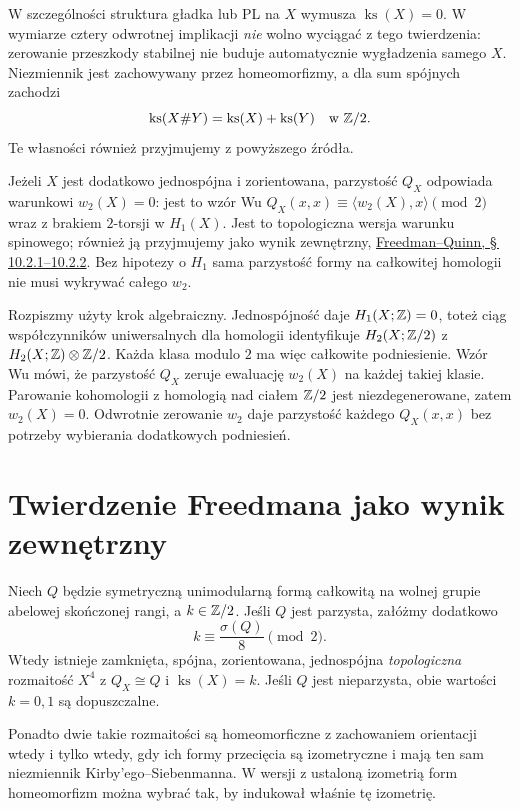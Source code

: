 W szczególności struktura gładka lub PL na $X$
wymusza $\operatorname{ks}(X)=0$. W wymiarze cztery
odwrotnej implikacji \emph{nie} wolno wyciągać z
tego twierdzenia: zerowanie przeszkody stabilnej
nie buduje automatycznie wygładzenia samego $X$.
Niezmiennik jest zachowywany przez homeomorfizmy,
a dla sum spójnych zachodzi
\[
 \operatorname{ks}(X\#Y)
   =\operatorname{ks}(X)+\operatorname{ks}(Y)
       \quad\text{w }\mathbb{Z}/2.
\]
Te własności również przyjmujemy z powyższego źródła.

Jeżeli $X$ jest dodatkowo jednospójna i zorientowana,
parzystość $Q_X$ odpowiada warunkowi
$w_2(X)=0$: jest to wzór Wu
$Q_X(x,x)\equiv\langle w_2(X),x\rangle\pmod2$
wraz z brakiem $2$-torsji w $H_1(X)$.
Jest to topologiczna wersja warunku spinowego;
również ją przyjmujemy jako wynik zewnętrzny,
\href{https://archive.mpim-bonn.mpg.de/4789/2/FreedmanQuinn-TopologyOf4Manifolds-Reformatted2013.pdf}
{Freedman--Quinn, \S\,10.2.1--10.2.2}.
Bez hipotezy o $H_1$ sama parzystość formy na
całkowitej homologii nie musi wykrywać całego $w_2$.

Rozpiszmy użyty krok algebraiczny. Jednospójność daje
$H_1(X;\mathbb{Z})=0$, toteż ciąg współczynników uniwersalnych
dla homologii identyfikuje
$H_2(X;\mathbb{Z}/2)$ z $H_2(X;\mathbb{Z})\otimes\mathbb{Z}/2$.
Każda klasa modulo $2$ ma więc całkowite podniesienie.
Wzór Wu mówi, że parzystość $Q_X$ zeruje ewaluację
$w_2(X)$ na każdej takiej klasie. Parowanie kohomologii
z homologią nad ciałem $\mathbb{Z}/2$ jest niezdegenerowane,
zatem $w_2(X)=0$. Odwrotnie zerowanie $w_2$ daje
parzystość każdego $Q_X(x,x)$ bez potrzeby wybierania
dodatkowych podniesień.

\section{Twierdzenie Freedmana jako wynik zewnętrzny}
\label{sec:freedman-classification}

\begin{twierdzenie}
\label{thm:freedman-classification}
Niech $Q$ będzie symetryczną unimodularną formą
całkowitą na wolnej grupie abelowej skończonej rangi,
a $k\in\mathbb{Z}/2$. Jeśli $Q$ jest parzysta, załóżmy
dodatkowo
\begin{equation}\label{eq:freedman-even-ks}
 k\equiv\frac{\sigma(Q)}8\pmod2.
\end{equation}
Wtedy istnieje zamknięta, spójna, zorientowana,
jednospójna \emph{topologiczna} rozmaitość
$X^4$ z $Q_X\cong Q$ i $\operatorname{ks}(X)=k$.
Jeśli $Q$ jest nieparzysta, obie wartości $k=0,1$
są dopuszczalne.

Ponadto dwie takie rozmaitości są homeomorficzne
z zachowaniem orientacji wtedy i tylko wtedy,
gdy ich formy przecięcia są izometryczne i mają
ten sam niezmiennik Kirby'ego--Siebenmanna.
W wersji z ustaloną izometrią form homeomorfizm
można wybrać tak, by indukował właśnie tę izometrię.
\end{twierdzenie}

